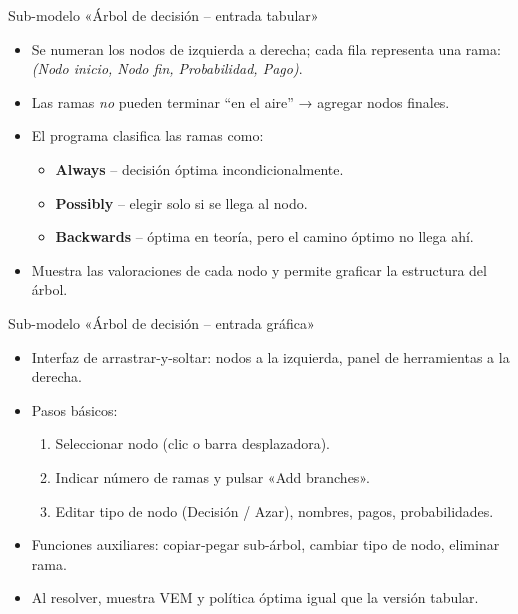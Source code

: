 \documentclass{beamer}
\begin{document}
\begin{frame}{Sub-modelo «Árbol de decisión – entrada tabular»}
  \begin{itemize}
    \item Se numeran los nodos de izquierda a derecha; cada fila representa una rama:
      \textit{(Nodo inicio, Nodo fin, Probabilidad, Pago)}.
    \item Las ramas \emph{no} pueden terminar “en el aire” → agregar nodos finales.
    \item El programa clasifica las ramas como:
      \begin{itemize}
        \item \textbf{Always} – decisión óptima incondicionalmente.
        \item \textbf{Possibly} – elegir solo si se llega al nodo.
        \item \textbf{Backwards} – óptima en teoría, pero el camino óptimo no llega ahí.
      \end{itemize}
    \item Muestra las valoraciones de cada nodo y permite graficar la estructura del árbol.
  \end{itemize}
\end{frame}

\begin{frame}{Sub-modelo «Árbol de decisión – entrada gráfica»}
  \begin{itemize}
    \item Interfaz de arrastrar-y-soltar: nodos a la izquierda, panel de herramientas a la derecha.
    \item Pasos básicos:
      \begin{enumerate}\footnotesize
        \item Seleccionar nodo (clic o barra desplazadora).
        \item Indicar número de ramas y pulsar «Add branches».
        \item Editar tipo de nodo (Decisión / Azar), nombres, pagos, probabilidades.
      \end{enumerate}
    \item Funciones auxiliares: copiar‐pegar sub-árbol, cambiar tipo de nodo, eliminar rama.
    \item Al resolver, muestra VEM y política óptima igual que la versión tabular.
  \end{itemize}
\end{frame}
\end{document}
